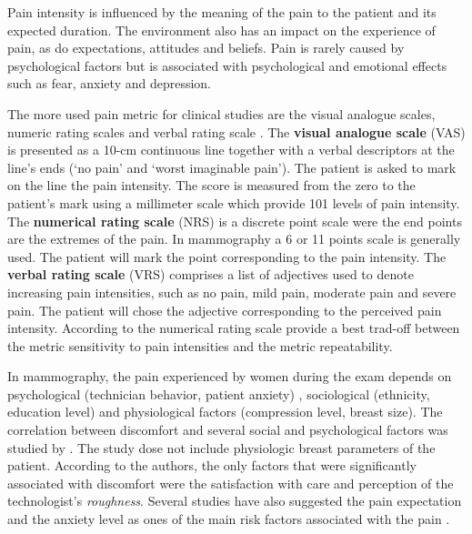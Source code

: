 Pain intensity is influenced by the meaning of the pain to the patient and its expected duration. The environment also has an impact on the experience of pain, as do expectations, attitudes and beliefs. Pain is rarely caused by psychological factors but is associated with psychological and emotional effects such as fear, anxiety and
depression.

The more used pain metric for clinical studies are the visual analogue scales, numeric rating scales and verbal rating scale \citep{williamson_pain_2005}. The \textbf{visual analogue scale} (VAS) is presented as a 10-cm continuous line together with a verbal descriptors at the line's ends (‘no pain’ and ‘worst imaginable pain'). The patient is asked to mark on the line the pain intensity. The score is measured from the zero to the patient's mark using a millimeter scale which provide 101 levels of pain
intensity. The \textbf{numerical rating scale} (NRS) is a discrete point scale were the end points are the extremes of the pain. In mammography a 6 or 11 points scale is generally used.  The patient will mark the point corresponding to the pain intensity. The \textbf{verbal rating scale} (VRS) comprises a list of adjectives used to denote increasing pain intensities, such as no pain, mild pain, moderate pain and severe pain. The patient will chose the adjective corresponding to the perceived pain intensity. According to \citep{williamson_pain_2005} the numerical rating scale  provide a best trad-off between the metric sensitivity to pain intensities and the metric repeatability.     

In mammography, the pain experienced by women during the exam depends on psychological  (technician behavior, patient anxiety) \citep{aro_pain_1996}, sociological  (ethnicity, education level) \citep{dullum_rates_2000} and physiological factors (compression level, breast size)\citep{poulos_breast_2003}.  The correlation between discomfort and several social and psychological factors was studied by  \cite{dullum_rates_2000}.  The study dose not include physiologic breast parameters of the patient. According to the authors, the only factors that were significantly associated with discomfort were the satisfaction with care and perception of the technologist's \textit{roughness}. Several studies have also suggested the pain expectation and the anxiety level as ones of the main risk factors associated with the pain \citep{aro_pain_1996,williamson_pain_2005,keemers_pain_2000,askhar_female_2017}.   

